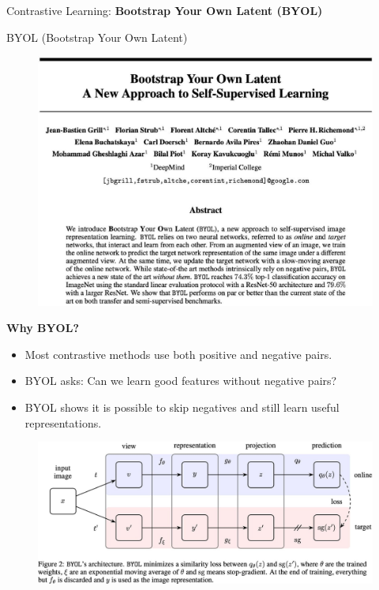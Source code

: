 \begin{frame}{}
    \LARGE Contrastive Learning: \textbf{Bootstrap Your Own Latent (BYOL)}
\end{frame}


\begin{frame}[allowframebreaks]{BYOL (Bootstrap Your Own Latent)}
\begin{figure}
    \centering
    \includegraphics[width=\linewidth,height=0.9\textheight,keepaspectratio]{images/contrastive/slide_80_1_img.jpg}
\end{figure}

\framebreak

\textbf{Why BYOL?}
\begin{itemize}
    \item Most contrastive methods use both positive and negative pairs.
    \item BYOL asks: Can we learn good features without negative pairs?
    \item BYOL shows it is possible to skip negatives and still learn useful representations.
\end{itemize}

\framebreak

\begin{figure}
    \centering
    \includegraphics[width=\linewidth,height=0.9\textheight,keepaspectratio]{images/contrastive/slide_81_1_img.jpg}
\end{figure}


\end{frame}

